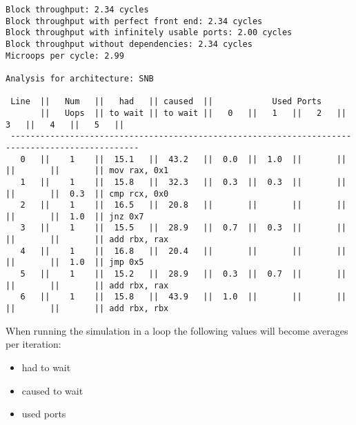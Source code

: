 \documentclass[a4paper,12pt,titlepage, twoside]{report}
\begin{document}
\begin{mdframed}[backgroundcolor=light-gray, roundcorner=10pt,leftmargin=1, rightmargin=1, innerleftmargin=15, innertopmargin=15,innerbottommargin=15, outerlinewidth=1, linecolor=light-gray]
\begin{center}
\begin{BVerbatim}[fontsize=\tiny]
Block throughput: 2.34 cycles
Block throughput with perfect front end: 2.34 cycles
Block throughput with infinitely usable ports: 2.00 cycles
Block throughput without dependencies: 2.34 cycles
Microops per cycle: 2.99

Analysis for architecture: SNB

 Line  ||   Num   ||   had   || caused  ||            Used Ports
       ||   Uops  || to wait || to wait ||   0   ||   1   ||   2   ||   3   ||   4   ||   5   ||
 ------------------------------------------------------------------------------------------------
   0   ||    1    ||  15.1   ||  43.2   ||  0.0  ||  1.0  ||       ||       ||       ||       || mov rax, 0x1
   1   ||    1    ||  15.8   ||  32.3   ||  0.3  ||  0.3  ||       ||       ||       ||  0.3  || cmp rcx, 0x0
   2   ||    1    ||  16.5   ||  20.8   ||       ||       ||       ||       ||       ||  1.0  || jnz 0x7
   3   ||    1    ||  15.5   ||  28.9   ||  0.7  ||  0.3  ||       ||       ||       ||       || add rbx, rax
   4   ||    1    ||  16.8   ||  20.4   ||       ||       ||       ||       ||       ||  1.0  || jmp 0x5
   5   ||    1    ||  15.2   ||  28.9   ||  0.3  ||  0.7  ||       ||       ||       ||       || add rbx, rax
   6   ||    1    ||  15.8   ||  43.9   ||  1.0  ||       ||       ||       ||       ||       || add rbx, rbx
\end{BVerbatim}
\end{center}
\end{mdframed}

When running the simulation in a loop the following values will become averages per iteration:

\begin{itemize}
    \item had to wait
    \item caused to wait
    \item used ports
\end{itemize} 
\end{document}
